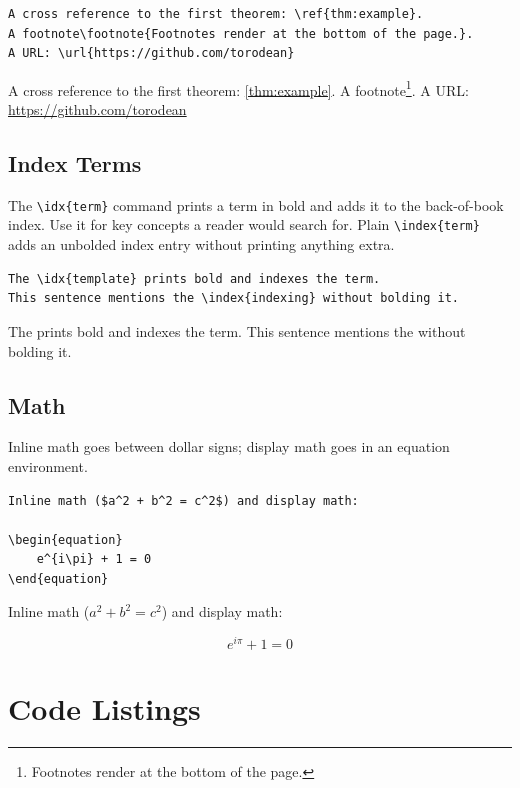 \begin{lstlisting}[style=latexstyle]
A cross reference to the first theorem: \ref{thm:example}.
A footnote\footnote{Footnotes render at the bottom of the page.}.
A URL: \url{https://github.com/torodean}
\end{lstlisting}

A cross reference to the first theorem: \ref{thm:example}. A footnote\footnote{Footnotes render at the bottom of the page.}. A URL: \url{https://github.com/torodean}

\subsection{Index Terms}

The \lstinline|\idx{term}| command prints a term in bold and adds it to the back-of-book index. Use it for key concepts a reader would search for. Plain \lstinline|\index{term}| adds an unbolded index entry without printing anything extra.

\begin{lstlisting}[style=latexstyle]
The \idx{template} prints bold and indexes the term.
This sentence mentions the \index{indexing} without bolding it.
\end{lstlisting}

The  prints bold and indexes the term.
This sentence mentions the  without bolding it.

\subsection{Math}

Inline math goes between dollar signs; display math goes in an equation environment.

\begin{lstlisting}[style=latexstyle]
Inline math ($a^2 + b^2 = c^2$) and display math:

\begin{equation}
	e^{i\pi} + 1 = 0
\end{equation}
\end{lstlisting}

Inline math ($a^2 + b^2 = c^2$) and display math:

\begin{equation}
	e^{i\pi} + 1 = 0
\end{equation}

\section{Code Listings}

